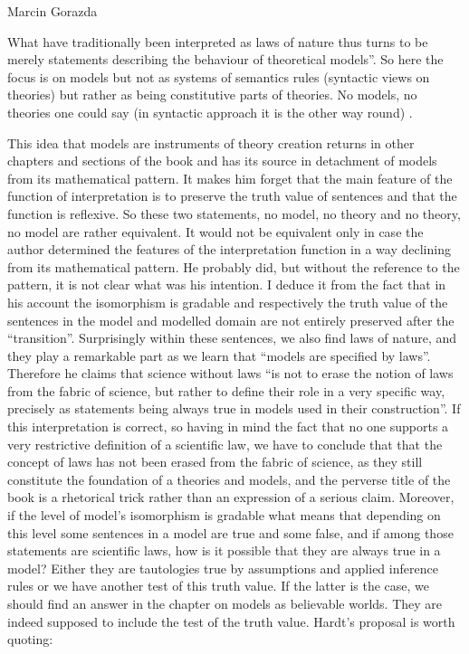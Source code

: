 \begin{recengenv}{Marcin Gorazda}
\begin{myquoterev}
What have traditionally been interpreted as laws of nature thus turns to be merely statements describing the behaviour
of theoretical models''. So here the focus is on models but not as systems of semantics rules (syntactic views on
theories) but rather as being constitutive parts of theories. No models, no theories one could say (in syntactic
approach it is the other way round)
\parencite[p.72]{hardt_economics_2017}.
\end{myquoterev}

This idea that models are instruments of theory creation returns in other chapters and sections of the book and has its
source in detachment of models from its mathematical pattern. It makes him forget that the main feature of the function
of interpretation is to preserve the truth value of sentences and that the function is reflexive. So these two
statements, no model, no theory and no theory, no model are rather equivalent. It would not be equivalent only in case
the author determined the features of the interpretation function in a way declining from its mathematical pattern. He
probably did, but without the reference to the pattern, it is not clear what was his intention. I deduce it from the
fact that in his account the isomorphism is gradable and respectively the truth value of the sentences in the model and
modelled domain are not entirely preserved after the ``transition''. Surprisingly within these sentences, we also find
laws of nature, and they play a remarkable part as we learn that  ``models are specified by laws''.  Therefore he claims
that science without laws ``is not to erase the notion of laws from the fabric of science, but rather to define their
role in a very specific way, precisely as statements being always true in models used in their construction''.  If this
interpretation is correct, so having in mind the fact that no one supports a very restrictive definition of a
scientific law, we have to conclude that that the concept of laws has not been erased from the fabric of science, as
they still constitute the foundation of a theories and models, and the perverse title of the book is a rhetorical trick
rather than an expression of a serious claim. Moreover, if the level of model’s isomorphism is gradable what means that
depending on this level some sentences in a model are true and some false, and if among those statements are scientific
laws, how is it possible that they are always true in a model? Either they are tautologies true by assumptions and
applied inference rules or we have another test of this truth value. If the latter is the case, we should find an
answer in the chapter on models as believable worlds. They are indeed supposed to include the test of the truth value.
Hardt’s proposal is worth quoting:


\end{recengenv}
